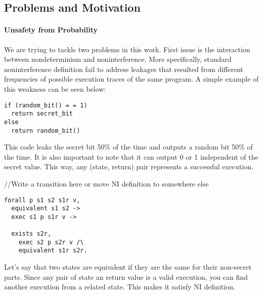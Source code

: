 \subsection*{Problems and Motivation}
\paragraph{Unsafety from Probability}
We are trying to tackle two problems in this work. First issue is the interaction between nondeterminism and noninterference. More specifically, standard noninterference definition fail to address leakages that resulted from different frequencies of possible execution traces of the same program. A simple example of this weakness can be seen below: 


\begin{lstlisting}
if (random_bit() = = 1)
  return secret_bit
else
  return random_bit()
\end{lstlisting}

This code leaks the secret bit 50\% of the time and outputs a random bit 50\% of the time. It is also important to note that it can output 0 or 1 independent of the secret value. This way, any (state, return) pair represents a successful execution. 

//Write a transition here or move NI definition to somewhere else


\begin{lstlisting}
forall p s1 s2 s1r v,
  equivalent s1 s2 ->
  exec s1 p s1r v ->
	
  exists s2r,
    exec s2 p s2r v /\
    equivalent s1r s2r.
\end{lstlisting} 

Let's say that two states are equivalent if they are the same for their non-secret parts. Since any pair of state an return value is a valid execution, you can find another execution from a related state. This makes it satisfy NI definition.

